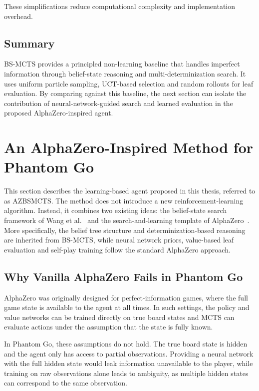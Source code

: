 \documentclass[12pt,oneside,openright]{article}
\begin{document}
These simplifications reduce computational complexity and implementation overhead.

\subsection{Summary}

BS-MCTS provides a principled non-learning baseline that handles imperfect information through belief-state reasoning and multi-determinization search. It uses uniform particle sampling, UCT-based selection and random rollouts for leaf evaluation. By comparing against this baseline, the next section can isolate the contribution of neural-network-guided search and learned evaluation in the proposed AlphaZero-inspired agent.

\section{An AlphaZero-Inspired Method for Phantom Go}
\label{sec:azbsmcts}

This section describes the learning-based agent proposed in this thesis, referred to
as AZBSMCTS. The method does not introduce a new reinforcement-learning
algorithm. Instead, it combines two existing ideas: the belief-state search framework
of Wang et al.~\cite{Wang2015bsmcts} and the search-and-learning template of
AlphaZero~\cite{Silver2017alphazero}. More specifically, the belief tree structure
and determinization-based reasoning are inherited from BS-MCTS, while neural
network priors, value-based leaf evaluation and self-play training follow the standard
AlphaZero approach.

\subsection{Why Vanilla AlphaZero Fails in Phantom Go}

AlphaZero was originally designed for perfect-information games, where the full game state is available to the agent at all times\cite{Silver2017alphazero}. In such settings, the policy and value networks can be trained directly on true board states and MCTS can evaluate actions under the assumption that the state is fully known.

In Phantom Go, these assumptions do not hold. The true board state is hidden and the agent only has access to partial observations. Providing a neural network with the full hidden state would leak information unavailable to the player, while training on raw observations alone leads to ambiguity, as multiple hidden states can correspond to the same observation.
\end{document}

